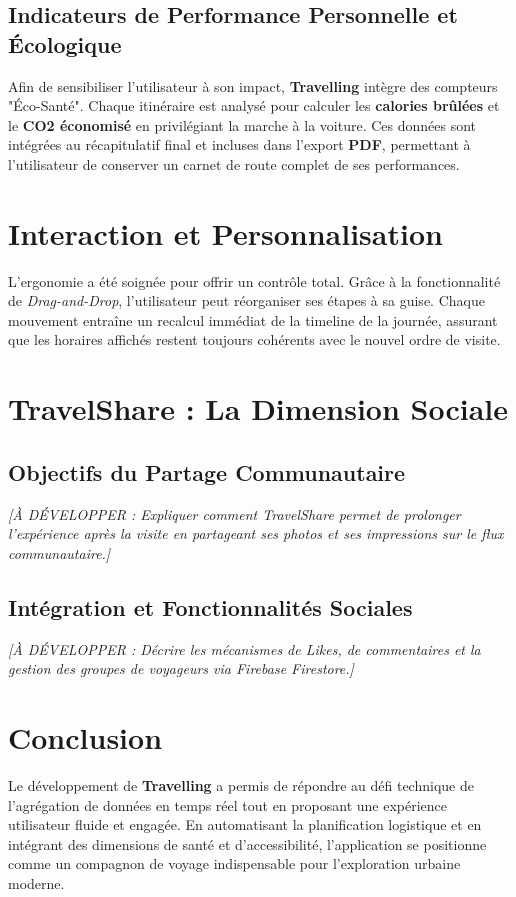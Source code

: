 \documentclass[12pt,a4paper]{article}
\begin{document}
\subsection{Indicateurs de Performance Personnelle et Écologique}
Afin de sensibiliser l'utilisateur à son impact, \textbf{Travelling} intègre des compteurs "Éco-Santé". Chaque itinéraire est analysé pour calculer les \textbf{calories brûlées} et le \textbf{CO2 économisé} en privilégiant la marche à la voiture. Ces données sont intégrées au récapitulatif final et incluses dans l'export \textbf{PDF}, permettant à l'utilisateur de conserver un carnet de route complet de ses performances.

\section{Interaction et Personnalisation}
L'ergonomie a été soignée pour offrir un contrôle total. Grâce à la fonctionnalité de \textit{Drag-and-Drop}, l'utilisateur peut réorganiser ses étapes à sa guise. Chaque mouvement entraîne un recalcul immédiat de la timeline de la journée, assurant que les horaires affichés restent toujours cohérents avec le nouvel ordre de visite.

\section{TravelShare : La Dimension Sociale}
\subsection{Objectifs du Partage Communautaire}
\textit{[À DÉVELOPPER : Expliquer comment TravelShare permet de prolonger l'expérience après la visite en partageant ses photos et ses impressions sur le flux communautaire.]}

\subsection{Intégration et Fonctionnalités Sociales}
\textit{[À DÉVELOPPER : Décrire les mécanismes de Likes, de commentaires et la gestion des groupes de voyageurs via Firebase Firestore.]}

\section{Conclusion}
Le développement de \textbf{Travelling} a permis de répondre au défi technique de l'agrégation de données en temps réel tout en proposant une expérience utilisateur fluide et engagée. En automatisant la planification logistique et en intégrant des dimensions de santé et d'accessibilité, l'application se positionne comme un compagnon de voyage indispensable pour l'exploration urbaine moderne.
\end{document}
